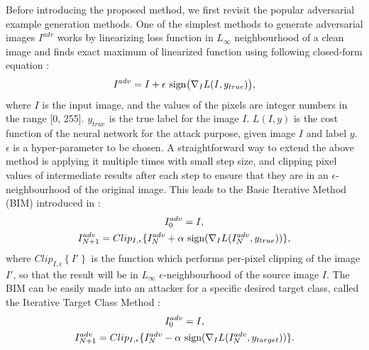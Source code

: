 Before introducing the proposed method, we first revisit the popular adversarial example generation methods. One of the simplest methods to generate adversarial images $I^{adv}$ works by linearizing loss function in $L_{\infty}$ neighbourhood of a clean image and finds exact maximum of linearized function using following closed-form equation \cite{FGSM}:
\vspace{-0.1cm}
\begin{equation}
    I^{adv} = I + \epsilon \text{ sign} \bigl( \nabla_I L(I, y_{true})  \bigr),
    \vspace{-0.1cm}
\end{equation}
where $I$ is the input image, and the values of the pixels are integer numbers in the range [0, 255]. $y_{true}$ is the true label for the image $I$. $L(I, y)$ is the cost function of the neural network for the attack purpose, given image $I$ and label $y$. $\epsilon$ is a hyper-parameter to be chosen. A straightforward way to extend the above method is applying it multiple times with small step size, and clipping pixel values of intermediate results after each step to ensure that they are in an $\epsilon$-neighbourhood of the original image.  This leads to the Basic Iterative Method (BIM) introduced in \cite{kurakin2017adversarial}: 
\vspace{-0.1cm}
\begin{equation}
    \begin{gathered}
        I_0^{adv} = I, \\
        I_{N+1}^{adv} = Clip_{I,\epsilon}\{I_N^{adv}+\alpha \text{ sign}(\nabla_I L(I_N^{adv},y_{true}))\},
    \end{gathered}
    \vspace{-0.1cm}
\end{equation}
where $Clip_{I, \epsilon} \left\{ I' \right\}$ is the function which performs per-pixel clipping of the image $I'$, so that the result will be in $L_{\infty}$ $\epsilon$-neighbourhood of the source image $I$.
The BIM can be easily made into an attacker for a specific desired target class, called the Iterative Target Class Method \cite{kurakin2017adversarial}:
\vspace{-0.1cm}
\begin{equation}
    \begin{gathered}
        I_0^{adv} = I,\\
        I_{N+1}^{adv} = Clip_{I,\epsilon}\{I_N^{adv}-\alpha \text{ sign}(\nabla_I L(I_N^{adv},y_{target}))\}.
    \end{gathered}
    \vspace{-0.1cm}
    \label{equ:itcm}
\end{equation}
